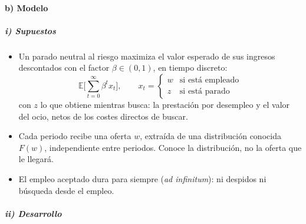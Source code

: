 \documentclass[11pt]{article}
\begin{document}
\paragraph{b) Modelo}

\subparagraph{i) Supuestos}

\begin{itemize}
\item Un parado neutral al riesgo maximiza el valor esperado de sus ingresos descontados con el factor $\beta\in(0,1)$, en tiempo discreto:
  \begin{equation}
  \mathbb{E}\Big[\sum_{t=0}^{\infty}\beta^{t}x_t\Big],\qquad x_t=\begin{cases}w & \text{si está empleado}\\ z & \text{si está parado}\end{cases}
  \end{equation}
  con $z$ lo que obtiene mientras busca: la prestación por desempleo y el valor del ocio, netos de los costes directos de buscar.
\item Cada periodo recibe una oferta $w$, extraída de una distribución conocida $F(w)$, independiente entre periodos. Conoce la distribución, no la oferta que le llegará.
\item El empleo aceptado dura para siempre (\emph{ad infinitum}): ni despidos ni búsqueda desde el empleo.
\end{itemize}

\subparagraph{ii) Desarrollo}
\end{document}
